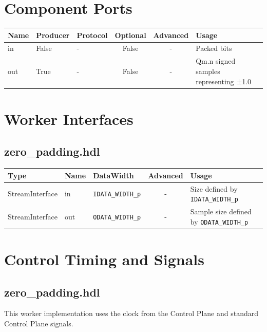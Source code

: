 \documentclass{article}
\def\comp{zero\_padding}
\begin{document}
\begin{landscape}
	\section*{Component Ports}
	\begin{scriptsize}
		\begin{tabular}{|M{2cm}|M{1.5cm}|M{4cm}|c|c|M{9cm}|}
			\hline
			Name & Producer & Protocol & Optional & Advanced & Usage                                  \\
			\hline
			in   & False    & -        & False    & -        & Packed bits                            \\
			\hline
			out  & True     & -        & False    & -        & Qm.n signed samples representing ±1.0 \\
			\hline
		\end{tabular}
	\end{scriptsize}

	\section*{Worker Interfaces}
	\subsection*{\comp.hdl}
	\begin{scriptsize}
		\begin{tabular}{|M{2cm}|M{1.5cm}|M{4cm}|c|M{12cm}|}
			\hline
			\rowcolor{blue}
			Type            & Name & DataWidth            & Advanced & Usage                                       \\
			\hline
			StreamInterface & in   & \verb+IDATA_WIDTH_p+ & -        & Size defined by \verb+IDATA_WIDTH_p+        \\
			\hline
			StreamInterface & out  & \verb+ODATA_WIDTH_p+ & -        & Sample size defined by \verb+ODATA_WIDTH_p+ \\
			\hline
		\end{tabular}
	\end{scriptsize}
\end{landscape}

\section*{Control Timing and Signals}
\subsection*{\comp.hdl}
\begin{flushleft}
	This worker implementation uses the clock from the Control Plane and standard Control Plane signals.
\end{flushleft}
\end{document}
